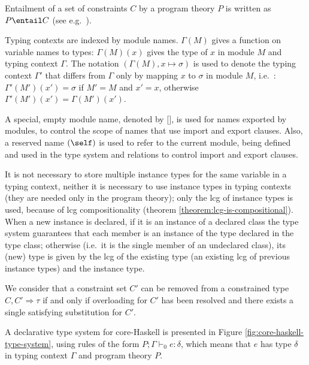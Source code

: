 Entailment of a set of constraints $C$ by a program theory $P$ is
written as $P \entail C$ (see
e.g.~\cite{JBCS-Ambiguity-and-constrained-polymorphism}).

Typing contexts are indexed by module names. $\Gamma(M)$ gives a
function on variable names to types: $\Gamma(M)(x)$ gives the type of
$x$ in module $M$ and typing context $\Gamma$.  The notation
$(\Gamma(M),x \mapsto \sigma)$ is used to denote the typing context
$\Gamma'$ that differs from $\Gamma$ only by mapping $x$ to $\sigma$
in module $M$, i.e.~: $\Gamma'(M')(x') = \sigma$ if $M' = M$ and
$x'=x$, otherwise $\Gamma'(M')(x') = \Gamma(M')(x')$.

A special, empty module name, denoted by $\texttt{[]}$, is used for
names exported by modules, to control the scope of names that use
import and export clauses. Also, a reserved name $(\self)$ is used to
refer to the current module, being defined and used in the type system
and relations to control import and export clauses.

It is not necessary to store multiple instance types for the same
variable in a typing context, neither it is necessary to use instance
types in typing contexts (they are needed only in the program theory);
only the lcg of instance types is used, because of lcg
compositionality (theorem \ref{theorem:lcg-is-compositional}). When a
new instance is declared, if it is an instance of a declared class the
type system guarantees that each member is an instance of the type
declared in the type class; otherwise (i.e.~it is the single member of
an undeclared class), its (new) type is given by the lcg of the
existing type (an existing lcg of previous instance types) and the
instance type.

We consider that a constraint set $C'$ can be removed from a
constrained type $C,C' \Rightarrow \tau$ if and only if overloading
for $C'$ has been resolved and there exists a single satisfying
substitution for
$C'$\cite{JBCS-Ambiguity-and-constrained-polymorphism}.

A declarative type system for core-Haskell is presented in Figure
\ref{fig:core-haskell-type-system}, using rules of the form $P;\Gamma
\vdash_0 e:\delta$, which means that $e$ has type $\delta$ in typing
context $\Gamma$ and program theory $P$. 

